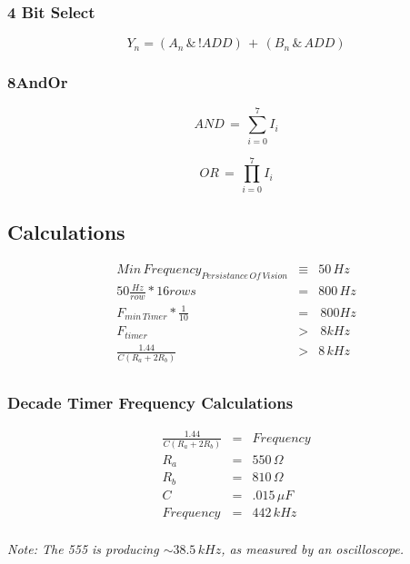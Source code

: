 \documentclass[letterpaper,titlepage,oneside]{article}
\begin{document}
\subsubsection{4 Bit Select}
\begin{equation}\nonumber
Y_{n} = (A_{n} \,\&\, !ADD) \,+\, (B_{n} \,\&\, ADD)
\end{equation}

\subsubsection{8AndOr}
\begin{equation}\nonumber
AND \,=\, \sum_{i=0}^{7} I_{i}
\end{equation}

\begin{equation}\nonumber
OR \, = \, \prod_{i=0}^{7} I_{i}
\end{equation}

\subsection{Calculations}
\begin{align*}
Min\,Frequency_{Persistance\, Of\, Vision} &\equiv& 50\,Hz\\
50 \frac{Hz}{row} * 16 rows&=& 800\,Hz \\
F_{min\,Timer} * \frac{1}{10} &=& \,800Hz \\
F_{timer} &>& \,8kHz \\
\frac{1.44}{C(R_{a} + 2 R_{b})} &>& 8\,kHz \\
\end{align*}

\subsubsection*{Decade Timer Frequency Calculations}
\begin{align*}
\frac{1.44}{C(R_{a} + 2 R_{b})} &=& Frequency \\
R_{a} &=& 550\,\Omega\\ 
R_{b} &=& 810\,\Omega\\
C &=& .015\,\mu F\\
Frequency &=& 442\,kHz\\
\end{align*}
\begin{center}
\begin{small}
\textit{Note: The 555 is producing  $\sim 38.5\,kHz$, as measured by an oscilloscope.}
\end{small}
\end{center}
\end{document}
